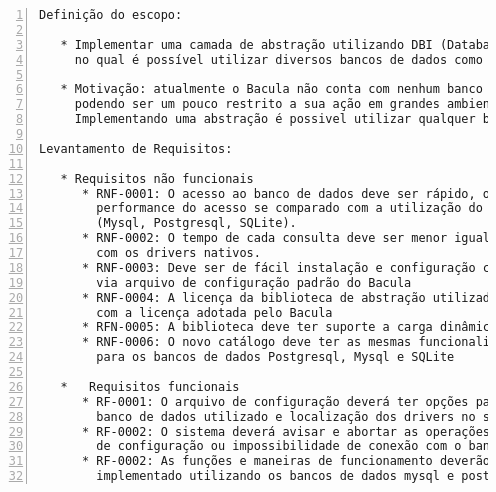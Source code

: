 \begin{Verbatim}[frame=single, fontsize=\tiny ,numbers=left]
Definição do escopo:

   * Implementar uma camada de abstração utilizando DBI (Database Abstraction Layer) 
     no qual é possível utilizar diversos bancos de dados como catálogo.

   * Motivação: atualmente o Bacula não conta com nenhum banco de dados proprietário 
     podendo ser um pouco restrito a sua ação em grandes ambientes coorporativos. 
     Implementando uma abstração é possivel utilizar qualquer banco de dados.

Levantamento de Requisitos:

   * Requisitos não funcionais
      * RNF-0001: O acesso ao banco de dados deve ser rápido, ou seja, não impactando na
        performance do acesso se comparado com a utilização do Bacula com drivers nativos
        (Mysql, Postgresql, SQLite).
      * RNF-0002: O tempo de cada consulta deve ser menor igual ou menor se comparado
        com os drivers nativos.
      * RNF-0003: Deve ser de fácil instalação e configuração com as opções configuradas
        via arquivo de configuração padrão do Bacula
      * RNF-0004: A licença da biblioteca de abstração utilizada deve ser compatível
        com a licença adotada pelo Bacula
      * RFN-0005: A biblioteca deve ter suporte a carga dinâmica
      * RNF-0006: O novo catálogo deve ter as mesmas funcionalidades já implementadas
        para os bancos de dados Postgresql, Mysql e SQLite

   *   Requisitos funcionais
      * RF-0001: O arquivo de configuração deverá ter opções para declarar o tipo do 
        banco de dados utilizado e localização dos drivers no sistema operacional.
      * RF-0002: O sistema deverá avisar e abortar as operações caso ocorra algum problema
        de configuração ou impossibilidade de conexão com o banco de dados.
      * RF-0002: As funções e maneiras de funcionamento deverão ser semelhantes ao já
        implementado utilizando os bancos de dados mysql e postgresql.
\end{Verbatim}

